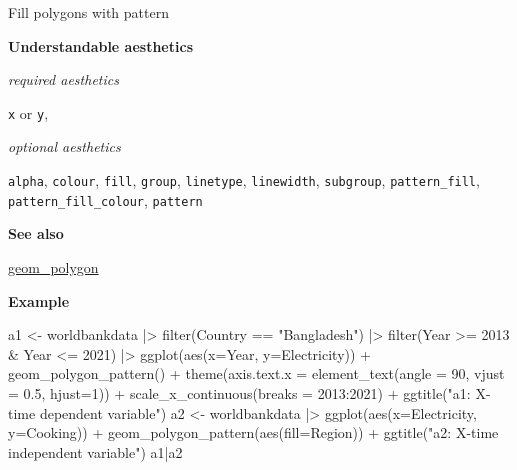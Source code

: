 \documentclass[
  letterpaper,
  DIV=11,
  numbers=noendperiod]{scrreprt}
\newenvironment{Shaded}{\begin{snugshade}}{\end{snugshade}}
\newcommand{\AttributeTok}[1]{\textcolor[rgb]{0.40,0.45,0.13}{#1}}
\newcommand{\DecValTok}[1]{\textcolor[rgb]{0.68,0.00,0.00}{#1}}
\newcommand{\FloatTok}[1]{\textcolor[rgb]{0.68,0.00,0.00}{#1}}
\newcommand{\FunctionTok}[1]{\textcolor[rgb]{0.28,0.35,0.67}{#1}}
\newcommand{\NormalTok}[1]{\textcolor[rgb]{0.00,0.23,0.31}{#1}}
\newcommand{\OtherTok}[1]{\textcolor[rgb]{0.00,0.23,0.31}{#1}}
\newcommand{\SpecialCharTok}[1]{\textcolor[rgb]{0.37,0.37,0.37}{#1}}
\newcommand{\StringTok}[1]{\textcolor[rgb]{0.13,0.47,0.30}{#1}}
\begin{document}
Fill polygons with pattern

\textbf{Understandable aesthetics}

\emph{required aesthetics}

\texttt{x} or \texttt{y},

\emph{optional aesthetics}

\texttt{alpha}, \texttt{colour}, \texttt{fill}, \texttt{group},
\texttt{linetype}, \texttt{linewidth}, \texttt{subgroup},
\texttt{pattern\_fill}, \texttt{pattern\_fill\_colour}, \texttt{pattern}

\textbf{See also}

\hyperref[polygon]{geom\_polygon}

\textbf{Example}

\begin{Shaded}
\begin{Highlighting}[]
\NormalTok{a1 }\OtherTok{\textless{}{-}}\NormalTok{ worldbankdata }\SpecialCharTok{|\textgreater{}}
  \FunctionTok{filter}\NormalTok{(Country }\SpecialCharTok{==} \StringTok{"Bangladesh"}\NormalTok{) }\SpecialCharTok{|\textgreater{}} 
  \FunctionTok{filter}\NormalTok{(Year }\SpecialCharTok{\textgreater{}=} \DecValTok{2013} \SpecialCharTok{\&}\NormalTok{ Year }\SpecialCharTok{\textless{}=} \DecValTok{2021}\NormalTok{) }\SpecialCharTok{|\textgreater{}}
  \FunctionTok{ggplot}\NormalTok{(}\FunctionTok{aes}\NormalTok{(}\AttributeTok{x=}\NormalTok{Year, }\AttributeTok{y=}\NormalTok{Electricity)) }\SpecialCharTok{+} 
  \FunctionTok{geom\_polygon\_pattern}\NormalTok{() }\SpecialCharTok{+}
  \FunctionTok{theme}\NormalTok{(}\AttributeTok{axis.text.x =} \FunctionTok{element\_text}\NormalTok{(}\AttributeTok{angle =} \DecValTok{90}\NormalTok{, }\AttributeTok{vjust =} \FloatTok{0.5}\NormalTok{, }\AttributeTok{hjust=}\DecValTok{1}\NormalTok{)) }\SpecialCharTok{+} 
  \FunctionTok{scale\_x\_continuous}\NormalTok{(}\AttributeTok{breaks =} \DecValTok{2013}\SpecialCharTok{:}\DecValTok{2021}\NormalTok{)  }\SpecialCharTok{+} 
  \FunctionTok{ggtitle}\NormalTok{(}\StringTok{"a1: X{-}time dependent variable"}\NormalTok{)}
\NormalTok{a2 }\OtherTok{\textless{}{-}}\NormalTok{ worldbankdata }\SpecialCharTok{|\textgreater{}}
  \FunctionTok{ggplot}\NormalTok{(}\FunctionTok{aes}\NormalTok{(}\AttributeTok{x=}\NormalTok{Electricity, }\AttributeTok{y=}\NormalTok{Cooking)) }\SpecialCharTok{+} 
  \FunctionTok{geom\_polygon\_pattern}\NormalTok{(}\FunctionTok{aes}\NormalTok{(}\AttributeTok{fill=}\NormalTok{Region)) }\SpecialCharTok{+} 
  \FunctionTok{ggtitle}\NormalTok{(}\StringTok{"a2: X{-}time independent variable"}\NormalTok{)}
\NormalTok{a1}\SpecialCharTok{|}\NormalTok{a2}
\end{Highlighting}
\end{Shaded}
\end{document}
